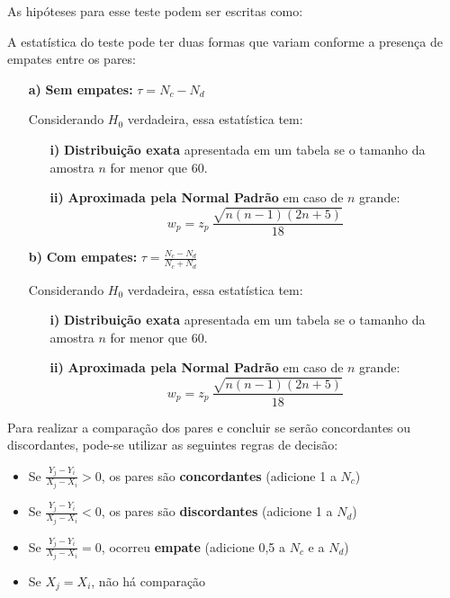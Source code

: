 \documentclass[
]{estat/estat}
\begin{document}
As hipóteses para esse teste podem ser escritas como:

A estatística do teste pode ter duas formas que variam conforme a
presença de empates entre os pares:

\begin{itemize}
    \item [\bf a)] \textbf{Sem empates:} $\displaystyle \tau = N_{c} - N_{d}$
    
    Considerando $H_{0}$ verdadeira, essa estatística tem:
    
    \begin{itemize}
        \item [\bf i)] \textbf{Distribuição exata} apresentada em um tabela se o tamanho da amostra $n$ for menor que 60.
        \item [\bf ii)] \textbf{Aproximada pela Normal Padrão} em caso de $n$ grande:
        $$ w_{p} = z_{p}\ \frac{\sqrt{n(n - 1)(2n + 5)}}{18} $$
    \end{itemize}
    
    \item [\bf b)] \textbf{Com empates:} $\displaystyle \tau = \frac{N_{c} - N_{d}}{N_{c} + N_{d}}$
    
    Considerando $H_{0}$ verdadeira, essa estatística tem:
    
    \begin{itemize}
        \item [\bf i)] \textbf{Distribuição exata} apresentada em um tabela se o tamanho da amostra $n$ for menor que 60.
        \item [\bf ii)] \textbf{Aproximada pela Normal Padrão} em caso de $n$ grande:
        $$ w_{p} = z_{p}\ \frac{\sqrt{n(n - 1)(2n + 5)}}{18} $$
    \end{itemize}
\end{itemize}

Para realizar a comparação dos pares e concluir se serão concordantes ou discordantes, pode-se utilizar as seguintes regras de decisão:

\begin{itemize}
    \item Se $\displaystyle \frac{Y_{j} - Y_{i}}{X_{j} - X_{i}} > 0$, os pares são \textbf{concordantes} (adicione 1 a $N_{c}$)
    
    \item Se $\displaystyle \frac{Y_{j} - Y_{i}}{X_{j} - X_{i}} < 0$, os pares são \textbf{discordantes} (adicione 1 a $N_{d}$)
    
    \item Se $\displaystyle \frac{Y_{j} - Y_{i}}{X_{j} - X_{i}} = 0$, ocorreu \textbf{empate} (adicione 0,5 a $N_{c}$ e a $N_{d}$)
    
    \item Se $X_{j} = X_{i}$, não há comparação
\end{itemize}
\end{document}
